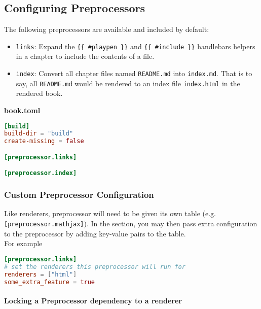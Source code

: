 \documentclass{article}
\begin{document}
\subsection{Configuring Preprocessors}
\label{Configuring Preprocessors}
\label{configuring-preprocessors}

The following preprocessors are available and included by default:\\
\begin{itemize}
\item \lstinline|links|: Expand the \lstinline|{{ #playpen }}| and \lstinline|{{ #include }}| handlebars
helpers in a chapter to include the contents of a file.
\item \lstinline|index|: Convert all chapter files named \lstinline|README.md| into \lstinline|index.md|. That is
to say, all \lstinline|README.md| would be rendered to an index file \lstinline|index.html| in the
rendered book.
\end{itemize}

\textbf{book.toml}\\
\begin{lstlisting}[language=toml]
[build]
build-dir = "build"
create-missing = false

[preprocessor.links]

[preprocessor.index]

\end{lstlisting}

\subsubsection{Custom Preprocessor Configuration}
\label{Custom Preprocessor Configuration}
\label{custom-preprocessor-configuration}

Like renderers, preprocessor will need to be given its own table (e.g.
\lstinline|[preprocessor.mathjax]|). In the section, you may then pass extra
configuration to the preprocessor by adding key-value pairs to the table.\\

For example\\
\begin{lstlisting}[language=toml]
[preprocessor.links]
# set the renderers this preprocessor will run for
renderers = ["html"]
some_extra_feature = true

\end{lstlisting}

\paragraph{Locking a Preprocessor dependency to a renderer}
\label{Locking a Preprocessor dependency to a renderer}
\label{locking-a-preprocessor-dependency-to-a-renderer}
\end{document}
